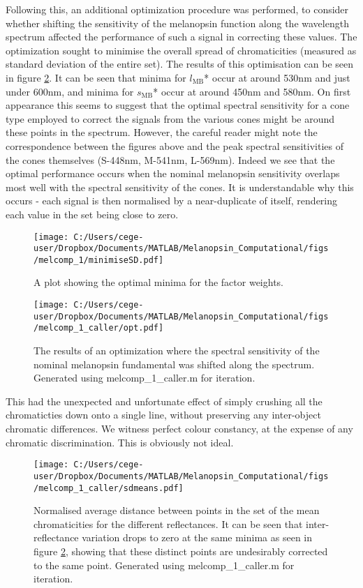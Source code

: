 \documentclass{article}
\begin{document}
Following this, an additional optimization procedure was performed, to consider whether shifting the sensitivity of the melanopsin function along the wavelength spectrum affected the performance of such a signal in correcting these values. The optimization sought to minimise the overall spread of chromaticities (measured as standard deviation of the entire set). The results of this optimisation can be seen in figure \ref{fig:opt}. It can be seen that minima for $l_{\text{MB}}$* occur at around 530nm and just under 600nm, and minima for $s_{\text{MB}}$* occur at around 450nm and 580nm. On first appearance this seems to suggest that the optimal spectral sensitivity for a cone type employed to correct the signals from the various cones might be around these points in the spectrum. However, the careful reader might note the correspondence between the figures above and the peak spectral sensitivities of the cones themselves (S-448nm, M-541nm, L-569nm). Indeed we see that the optimal performance occurs when the nominal melanopsin sensitivity overlaps most well with the spectral sensitivity of the cones. It is understandable why this occurs - each signal is then normalised by a near-duplicate of itself, rendering each value in the set being close to zero.

\begin{figure}[h]
    \centering
    \texttt{[image: C:/Users/cege-user/Dropbox/Documents/MATLAB/Melanopsin\_Computational/figs/melcomp\_1/minimiseSD.pdf]}
    \caption{A plot showing the optimal minima for the factor weights.}
    \label{fig:minSD}
\end{figure} 

\begin{figure}[ht]
    \centering
    \texttt{[image: C:/Users/cege-user/Dropbox/Documents/MATLAB/Melanopsin\_Computational/figs/melcomp\_1\_caller/opt.pdf]}
    \caption{The results of an optimization where the spectral sensitivity of the nominal melanopsin fundamental was shifted along the spectrum. Generated using melcomp\_1\_caller.m for iteration.}
    \label{fig:opt}
\end{figure} 

This had the unexpected and unfortunate effect of simply crushing all the chromaticties down onto a single line, without preserving any inter-object chromatic differences. We witness perfect colour constancy, at the expense of any chromatic discrimination. This is obviously not ideal.

\begin{figure}[h]
    \centering
    \texttt{[image: C:/Users/cege-user/Dropbox/Documents/MATLAB/Melanopsin\_Computational/figs/melcomp\_1\_caller/sdmeans.pdf]}
    \caption{Normalised average distance between points in the set of the mean chromaticities for the different reflectances. It can be seen that inter-reflectance variation drops to zero at the same minima as seen in figure \ref{fig:opt}, showing that these distinct points are undesirably corrected to the same point. Generated using melcomp\_1\_caller.m for iteration.}
    \label{fig:sdmeans}
\end{figure} 
\end{document}
